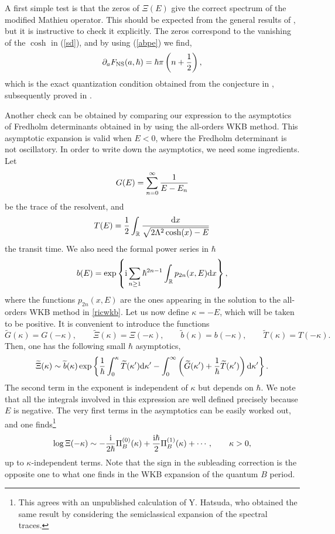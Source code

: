 \documentclass[a4paper,11pt]{article}
\theoremstyle{definition}
\def\IR{{\mathbb R}}
\newcommand{\ri}{{\rm i}}
\newcommand{\rd}{{\rm d}}
\newcommand{\be}{\begin{equation}}
\newcommand{\ee}{\end{equation}}
\def\IR{\mathbb{R}}
\begin{document}
A first simple test is that the zeros of $\Xi(E)$ give the correct spectrum of the modified Mathieu operator. This should be expected 
from the general results of \cite{gm3}, but it is instructive to check it explicitly. 
The zeros correspond to the vanishing of the $\cosh$ in (\ref{sd}), and by using 
(\ref{abpe}) we find,
%
\be 
\label{eqref} \partial_{a}F_{\rm NS}(a,\hbar)= \hbar  \pi  \left( n+{1\over 2} \right), 
\ee
%
which is the exact quantization condition obtained from the conjecture in \cite{ns}, subsequently proved in \cite{kt2}. 

 
 Another check can be obtained by comparing our expression to the asymptotics of Fredholm determinants obtained in \cite{voros,voros-zq,voros-quartic} 
 by using the all-orders WKB method. This asymptotic expansion is valid when $E<0$, where the Fredholm determinant is not oscillatory. In order to write down 
 the asymptotics, we need some ingredients. Let 
%
\be
G(E) =\sum_{n =0}^\infty {1\over E-E_n}
\ee
%
be the trace of the resolvent, and 
%
\be
T(E)=  {1\over 2} \int_\IR {\rd x \over {\sqrt{2\Lambda^2 \cosh(x)-E}}} 
\ee
%
the transit time. We also need the formal power series in $\hbar$ 
%
\be
\label{aewkb}
b(E) =  \exp \left\{  \ri \sum_{n\ge 1} \hbar^{2n-1} \int_\IR p_{2n} (x, E) \rd x \right\}, 
\ee
%
where the functions $p_{2n}(x,E)$ are the ones appearing in the solution to the all-orders WKB method in \eqref{ricwkb}. 
Let us now define $\kappa=-E$, which will be taken to be positive. It is convenient to introduce the functions
%
\be
\widetilde G(\kappa)= G(-\kappa), \qquad \widetilde \Xi(\kappa)= \Xi(-\kappa), \qquad \widetilde b(\kappa) =b(-\kappa), \qquad \widetilde T(\kappa)= T(-\kappa).
\ee
%
Then, one has the following small $\hbar$ asymptotics,  
 \be
 \label{xi-as}
\widetilde \Xi(\kappa)\sim  \widetilde b(\kappa) \exp\left\{ {1\over \hbar} \int_0^\kappa \widetilde T(\kappa') \rd \kappa' - \int_0^\infty  \left( \widetilde G(\kappa') +{1\over \hbar} \widetilde T(\kappa') \right) \rd \kappa' \right\}.   
 \ee
The second term in the exponent is independent of $\kappa$ but depends on $\hbar$. We note that all the integrals involved in this expression are well 
defined precisely because 
$E$ is negative. The very first terms in the asymptotics can be easily worked out, and one finds\footnote{This agrees with an unpublished calculation of 
Y. Hatsuda, who obtained the same result by considering the semiclassical expansion of the spectral traces.} 
%
\be
\label{wkb-sd}
\log\Xi(-\kappa) \sim - {\ri \over 2 \hbar} \Pi_B^{(0)}(\kappa)+{\ri \hbar \over 2}\Pi_B^{(1)}(\kappa)+ \cdots,  \qquad \kappa>0, 
\ee
%
up to $\kappa$-independent terms. Note that the sign in the subleading correction is the opposite one to what one finds in the WKB expansion of the quantum $B$ period. 
\end{document}
